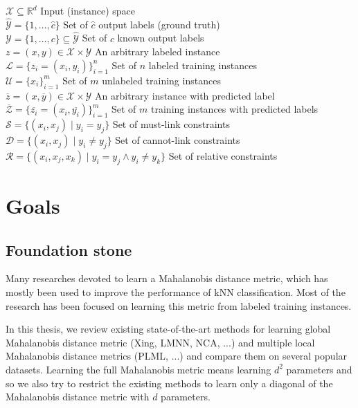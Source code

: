 \documentclass[12pt,a4paper]{report}
\begin{document}
\begin{tabbing}
$\mathcal{X} \subseteq \mathbb{R}^d$ \> Input (instance) space \\
$\widehat{\mathcal{Y}} = \{ 1, \ldots ,\widehat{c} \}$ \> Set of $\widehat{c}$ output labels (ground truth) \\
$\mathcal{Y} = \{ 1, \ldots ,c \} \subseteq \widehat{\mathcal{Y}}$ \> Set of $c$ known output labels \\
$z=(x,y) \in \mathcal{X} \times \mathcal{Y}$ \> An arbitrary labeled instance \\
$\mathcal{L}=\{z_i=(x_i, y_i)\}^n_{i=1}$ \> Set of $n$ labeled training instances \\
$\mathcal{U} = \{x_i \}^m_{i=1}$ \> Set of $m$ unlabeled training instances \\
$\overline{z} = (x, \overline{y}) \in \mathcal{X} \times \widehat{\mathcal{Y}} $ \> An arbitrary instance with predicted label \\
$\overline{\mathcal{Z}} = \{\overline{z_i} = (x_i, \overline{y_i}) \}^m_{i=1}$ \> Set of $m$ training instances with predicted labels \\
$\mathcal{S} = \{ (x_i, x_j) \mid y_i = y_j \}$ \> Set of must-link constraints \\
$\mathcal{D} = \{ (x_i, x_j) \mid y_i \neq y_j \}$ \> Set of cannot-link constraints \\
$\mathcal{R} = \{ (x_i, x_j, x_k) \mid y_i = y_j \wedge y_i \neq y_k \}$ \> Set of relative constraints \\
\end{tabbing} 

\section{Goals}

\subsection{Foundation stone}

Many researches devoted to learn a Mahalanobis distance metric, which has mostly been used to improve the performance of kNN classification. Most of the research has been focused on learning this metric from labeled training instances.

In this thesis, we review existing state-of-the-art methods for learning global Mahalanobis distance metric (Xing, LMNN, NCA, ...) and multiple local Mahalanobis distance metrics (PLML, ...) and compare them on several popular datasets. Learning the full Mahalanobis metric means learning $d^2$ parameters and so we also try to restrict the existing methods to learn only a diagonal of the Mahalanobis distance metric with $d$ parameters.
\end{document}
